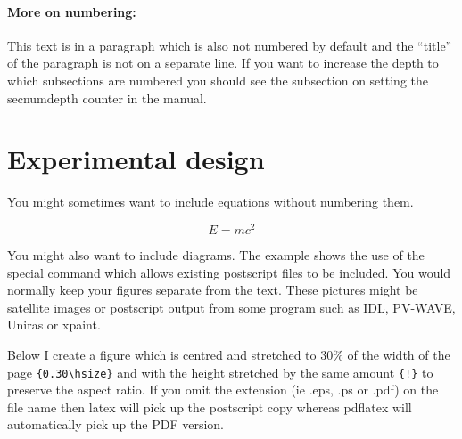 \documentclass[12pt,a4paper]{article}
\begin{document}
\paragraph{More on numbering:}

This text is in a paragraph which is also not numbered by default and
the ``title'' of the paragraph is not on a separate line.
If you want to increase the depth to which subsections are numbered you
should see the subsection on setting the secnumdepth counter in the manual. 

\section{Experimental design}

You might sometimes want to include equations without numbering them.

\begin{displaymath}
E=mc^{2}
\end{displaymath}

You might also want to include diagrams.  The example shows the use of
the special command which allows existing postscript files to be
included.  You would normally keep your figures separate from the text. 
These pictures might be satellite images or postscript output from some
program such as IDL, PV-WAVE, Uniras or xpaint.

Below I create a figure which is centred and stretched to 30\% of the
width of the page \verb+{0.30\hsize}+ and with the height stretched by
the same amount \verb+{!}+ to preserve the aspect ratio. If you omit the
extension (ie .eps, .ps or .pdf) on the file name then latex will pick
up the postscript copy whereas pdflatex will automatically pick up the
PDF version.
\end{document}
